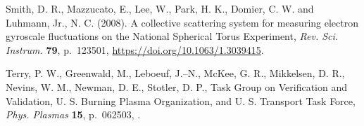 \documentclass[a4paper,openany,12pt]{report}
\begin{document}
\begin{thebibliography}{175}
\bibitem{}
Smith, D. R., Mazzucato, E., Lee, W., Park, H. K., Domier, C. W. and Luhmann, Jr., N. C. (2008). A collective scattering system for measuring electron gyroscale fluctuations on the National Spherical Torus Experiment, \emph{Rev. Sci. Instrum.} \textbf{79}, p.~123501, \url{https://doi.org/10.1063/1.3039415}.

\bibitem{}
Terry, P. W., Greenwald, M., Leboeuf, J.--N., McKee, G. R., Mikkelsen, D. R., Nevins, W. M., Newman, D. E., Stotler, D. P., Task Group on Verification and Validation, U. S. Burning Plasma Organization, and U. S. Transport Task Force, \emph{Phys. Plasmas} \textbf{15}, p.~062503, \url{}.

\end{thebibliography}
\end{document}
